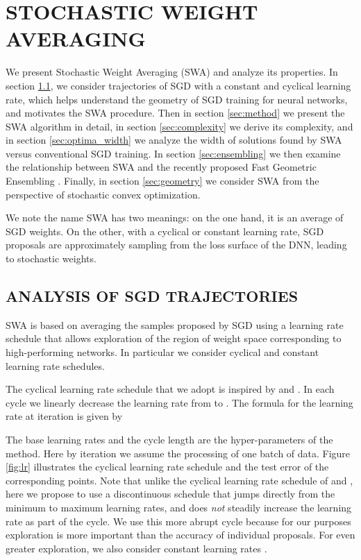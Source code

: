 \documentclass[letterpaper]{article}
\begin{document}
\section{STOCHASTIC WEIGHT AVERAGING}

We present Stochastic Weight Averaging (SWA) and analyze its
properties. In section \ref{sec:motivation}, we consider trajectories
of SGD with a constant and cyclical learning rate, which helps understand
the geometry of SGD training for neural networks, and motivates the SWA 
procedure. Then in section \ref{sec:method} we present the SWA algorithm
in detail, in section \ref{sec:complexity} we derive its complexity, and in section
\ref{sec:optima_width} we analyze the width of solutions found by 
SWA versus conventional SGD training. In section \ref{sec:ensembling} 
we then examine the relationship between SWA and the recently proposed
Fast Geometric Ensembling \citep{garipov2018}. Finally, in section
\ref{sec:geometry} we consider SWA from the perspective of 
stochastic convex optimization.

We note the name SWA has two meanings: on the one hand, it is an average of 
SGD weights.  On the other, with a cyclical or constant learning rate, SGD 
proposals are approximately sampling from the loss surface of the DNN, 
leading to stochastic weights.

\subsection{ANALYSIS OF SGD TRAJECTORIES}
\label{sec:motivation}

SWA is based on averaging the samples proposed by SGD using a learning rate
schedule that allows exploration of the region of weight space corresponding
to high-performing networks. In particular we
consider cyclical and constant learning rate schedules.

The cyclical learning rate schedule that we adopt is inspired by 
\citet{garipov2018} and \citet{smith2017exploring}. 
In each cycle we linearly decrease the learning rate from  to
. The formula for the learning rate
at iteration  is given by

The base learning rates  and the cycle length   are the hyper-parameters of 
the method. 
Here by iteration we assume the processing of one batch of data.
Figure \ref{fig:lr} illustrates the 
cyclical learning rate schedule and the test error of the corresponding points.
Note that unlike the cyclical learning rate schedule of 
\citet{garipov2018} and \citet{smith2017exploring}, here we propose to use a 
discontinuous schedule that jumps directly from the minimum to maximum learning 
rates, and does \emph{not} steadily increase the learning rate as part of 
the cycle.  We use this more abrupt cycle because for our purposes exploration
is more important than the accuracy of individual proposals. For even greater 
exploration, we also consider constant learning rates .
\end{document}
